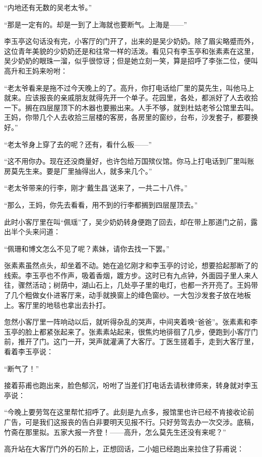 \par “内地还有无数的吴老太爷。”
\par “那是一定有的。却是一到了上海就也要断气。上海是——”
\par 李玉亭这句话没有完，小客厅的门开了，出来的是吴少奶奶。除了眉尖略蹙而外，这位青年美貌的少奶奶还是和往常一样的活泼。看见只有李玉亭和张素素在这里，吴少奶奶的眼珠一溜，似乎很惊讶；但是她立刻一笑，算是招呼了李张二位，便叫高升和王妈来吩咐：
\par “老太爷看来是拖不过今天晚上的了。高升，你打电话给厂里的莫先生，叫他马上就来。应该报丧的亲戚朋友就得先开一个单子。花园里，各处，都派好了人去收拾一下。搁在四层屋顶下的木器也要搬出来。人手不够，就到杜姑老爷公馆里去叫。王妈，你带几个人去收拾三层楼的客房，各房里的窗纱，台布，沙发套子，都要换好。”
\par “老太爷身上穿了去的呢？还有，看什么板——”
\par “这不用你办。现在还没商量好，也许包给万国殡仪馆。你马上打电话到厂里叫账房莫先生来。要是厂里抽得出人，就多来几个。”
\par “老太爷带来的行李，刚才‘戴生昌’送来了，一共二十八件。”
\par “那么，王妈，你先去看看，用不到的行李都搁到四层屋顶去。”
\par 此时小客厅里在叫“佩瑶”了，吴少奶奶转身便跑了回去，却在带上那道门之前，露出半个头来问道：
\par “佩珊和博文怎么不见了呢？素妹，请你去找一下罢。”
\par 张素素虽然点头，却坐着不动。她在追忆刚才和李玉亭的讨论，想要拾起那断了的线索。李玉亭也不作声，吸着香烟，踱方步。这时已有九点钟，外面园子里人来人往，骤然活动；树荫中，湖山石上，几处亭子里的电灯，也都一齐开亮了。王妈带了几个粗做女仆进客厅来，动手就换窗上的绛色窗纱。一大包沙发套子放在地板上。客厅里的地毯也拿出去扑打。
\par 忽然小客厅里一阵响动以后，就听得杂乱的哭声，中间夹着唤“爸爸”。张素素和李玉亭的脸上都紧张起来了。张素素站起来，很焦灼地徘徊了几步，便跑到小客厅门前，推开了门。这门一开，哭声就灌满了大客厅。丁医生搓着手，走到大客厅里，看着李玉亭说：
\par “断气了！”
\par 接着荪甫也跑出来，脸色郁沉，吩咐了当差们打电话去请秋律师来，转身就对李玉亭说：
\par “今晚上要劳驾在这里帮忙招呼了。此刻是九点多，报馆里也许已经不肯接收论前广告，可是我们这报丧的告白非要明天见报不行。只好劳驾去办一次交涉。底稿，竹斋在那里拟。五家大报一齐登！——高升，怎么莫先生还没有来呢？”
\par 高升站在大客厅门外的石阶上，正想回话，二小姐已经跑出来拉住了荪甫说：
